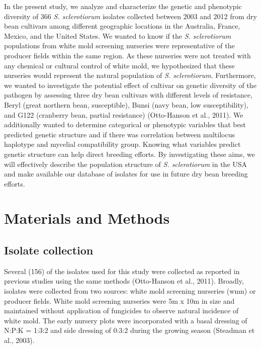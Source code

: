 In the present study, we analyze and characterize the genetic and
phenotypic diversity of 366 \emph{S. sclerotiorum} isolates collected
between 2003 and 2012 from dry bean cultivars among different geographic
locations in the Australia, France, Mexico, and the United States. We
wanted to know if the \emph{S. sclerotiorum} populations from white mold
screening nurseries were representative of the producer fields within
the same region. As these nurseries were not treated with any chemical
or cultural control of white mold, we hypothesized that these nurseries
would represent the natural population of \emph{S. sclerotiorum}.
Furthermore, we wanted to investigate the potential effect of cultivar
on genetic diversity of the pathogen by assessing three dry bean
cultivars with different levels of resistance, Beryl (great northern
bean, susceptible), Bunsi (navy bean, low susceptibility), and G122
(cranberry bean, partial resistance) (Otto-Hanson et al., 2011). We
additionally wanted to determine categorical or phenotypic variables
that best predicted genetic structure and if there was correlation
between multilocus haplotype and mycelial compatibility group. Knowing
what variables predict genetic structure can help direct breeding
efforts. By investigating these aims, we will effectively describe the
population structure of \emph{S. sclerotiorum} in the USA and make
available our database of isolates for use in future dry bean breeding
efforts.

\section*{Materials and Methods}\label{materials-and-methods}

\subsection*{Isolate collection}\label{isolate-collection}

Several (156) of the isolates used for this study were collected as
reported in previous studies using the same methods (Otto-Hanson et al.,
2011). Broadly, isolates were collected from two sources: white mold
screening nurseries (wmn) or producer fields. White mold screening
nurseries were 5m x 10m in size and maintained without application of
fungicides to observe natural incidence of white mold. The early nursery
plots were incorporated with a basal dressing of N:P:K = 1:3:2 and side
dressing of 0:3:2 during the growing season (Steadman et al., 2003).

